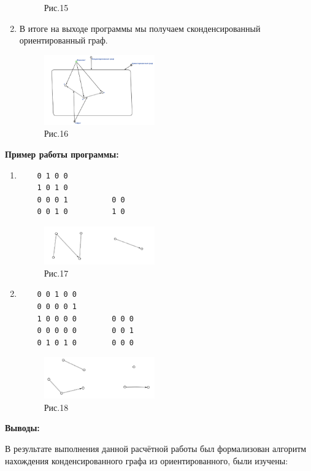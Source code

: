 \documentclass[10pt,a4paper,twocolumn]{article}
\begin{document}
\begin{enumerate}
\begin{figure}[h]
		\caption{Рис.15}
	\end{figure}
    \newpage
\item В итоге на выходе программы мы получаем сконденсированный ориентированный граф.
	\begin{figure}[h]
		\includegraphics[width=0.45\textwidth]{img/17.png}
		\caption{Рис.16}
	\end{figure}
\end{enumerate}
\large{\textbf{Пример работы программы:}}
\begin{enumerate}
    \item 
    \begin{verbatim}
    0 1 0 0          
    1 0 1 0          
    0 0 0 1          0 0
    0 0 1 0          1 0
    \end{verbatim}
    \begin{figure}[h]
		\includegraphics[width=0.45\textwidth]{img/a1.png}
		\caption{Рис.17}
	\end{figure}
        \item 
    \begin{verbatim}
    0 0 1 0 0        
    0 0 0 0 1        
    1 0 0 0 0        0 0 0
    0 0 0 0 0        0 0 1
    0 1 0 1 0        0 0 0 
    \end{verbatim}
    \begin{figure}[h]
		\includegraphics[width=0.45\textwidth]{img/a2.png}
		\caption{Рис.18}
	\end{figure}
\end{enumerate}
\large{\textbf{Выводы:}}
\par В результате выполнения данной расчётной работы был формализован алгоритм нахождения конденсированного графа из ориентированного, были изучены:
\end{document}
